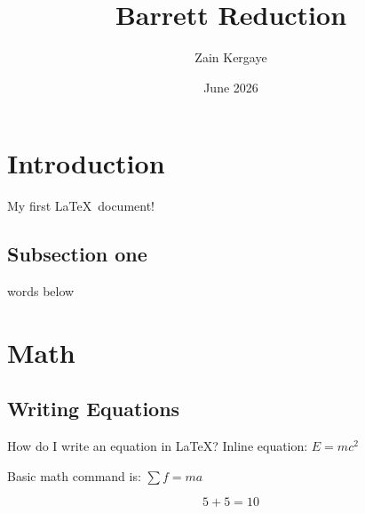 \documentclass{article}
\title{Barrett Reduction}
\author{Zain Kergaye}
\date{June 2026}
\begin{document}
\maketitle

\section{Introduction}\label{sec:LAB}
My first \LaTeX~document!

\subsection{Subsection one}
words below


\newpage

\section{Math}
\subsection{Writing Equations}
How do I write an equation in \LaTeX? 
Inline equation: $E=mc^2$


Basic math command is: $\sum f=ma$

\begin{equation}
5 + 5 = 10
\end{equation}
\end{document}
